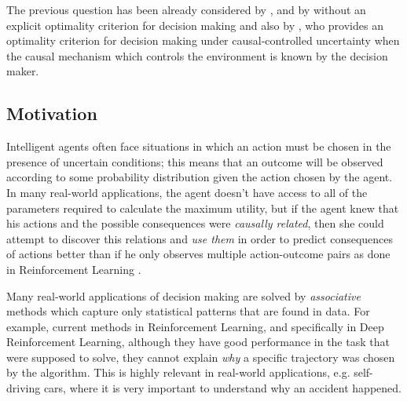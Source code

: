 \documentclass{svjour3}                     %
\begin{document}
The previous question has been already considered by \cite{nozick1969newcomb}, \cite{lewis1981causal} and by \cite{joyce1999foundations} without an explicit optimality criterion for decision making and also by \cite{pearl2009causality}, who provides an optimality criterion for decision making under causal-controlled uncertainty when the causal mechanism which controls the environment is known by the decision maker. 

\subsection{Motivation}
Intelligent agents often face situations in which an action must be chosen in the presence of uncertain conditions; this means that an outcome will be observed according to some probability distribution given the action chosen by the agent. In many real-world applications, the agent doesn't have access to all of the parameters required to calculate the maximum utility, but if the agent knew that his actions and the possible consequences were \textit{causally related}, then she could attempt to discover this relations and \textit{use them} in order to predict consequences of actions better than if he only observes multiple action-outcome pairs as done in Reinforcement Learning \citep{sutton1998reinforcement}. 
	
Many real-world applications of decision making are solved by \textit{associative} methods which capture only statistical patterns that are found in data. For example, current methods in Reinforcement Learning, and specifically in Deep Reinforcement Learning, although they have good performance in the task that were supposed to solve, they cannot explain \textit{why} a specific trajectory was chosen by the algorithm. This is highly relevant in real-world applications, e.g. self-driving cars, where it is very important to understand why an accident happened. 
	
	
\end{document}
